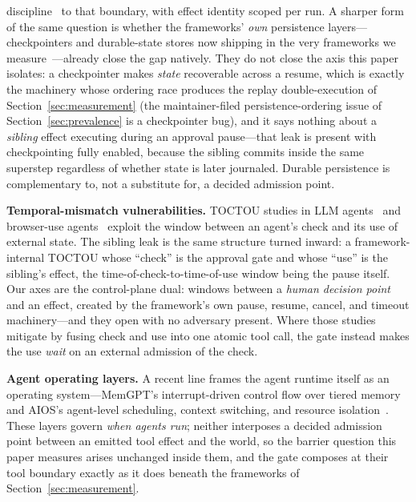 \documentclass[10pt,journal,compsoc]{IEEEtran}
\begin{document}
discipline~\cite{helland12} to that boundary, with effect identity scoped per
run. A sharper form of the same question is whether the frameworks' \emph{own}
persistence layers---checkpointers and durable-state stores now shipping in
the very frameworks we measure~\cite{lgdocs26}---already close the gap
natively. They do not close the axis this paper isolates: a checkpointer makes
\emph{state} recoverable across a resume, which is exactly the machinery whose
ordering race produces the replay double-execution of
Section~\ref{sec:measurement} (the maintainer-filed persistence-ordering issue
of Section~\ref{sec:prevalence} is a checkpointer bug), and it says nothing
about a \emph{sibling} effect executing during an approval pause---that leak is
present with checkpointing fully enabled, because the sibling commits inside
the same superstep regardless of whether state is later journaled. Durable
persistence is complementary to, not a substitute for, a decided admission
point.

\textbf{Temporal-mismatch vulnerabilities.} TOCTOU studies in LLM
agents~\cite{toctou-mindgap25} and browser-use agents~\cite{toctou-browser26}
exploit the window between an agent's check and its use of external state. The
sibling leak is the same structure turned inward: a framework-internal TOCTOU
whose ``check'' is the approval gate and whose ``use'' is the sibling's effect,
the time-of-check-to-time-of-use window being the pause itself. Our
axes are the control-plane dual: windows between a \emph{human decision
point} and an effect, created by the framework's own pause, resume, cancel,
and timeout machinery---and they open with no adversary present. Where those
studies mitigate by fusing check and use into one atomic tool call, the gate
instead makes the use \emph{wait} on an external admission of the check.

\textbf{Agent operating layers.} A recent line frames the agent runtime
itself as an operating system---MemGPT's interrupt-driven control flow over
tiered memory~\cite{memgpt23} and AIOS's agent-level scheduling, context
switching, and resource isolation~\cite{aios24}. These layers govern
\emph{when agents run}; neither interposes a decided admission point between
an emitted tool effect and the world, so the barrier question this paper
measures arises unchanged inside them, and the gate composes at their tool
boundary exactly as it does beneath the frameworks of
Section~\ref{sec:measurement}.
\end{document}
